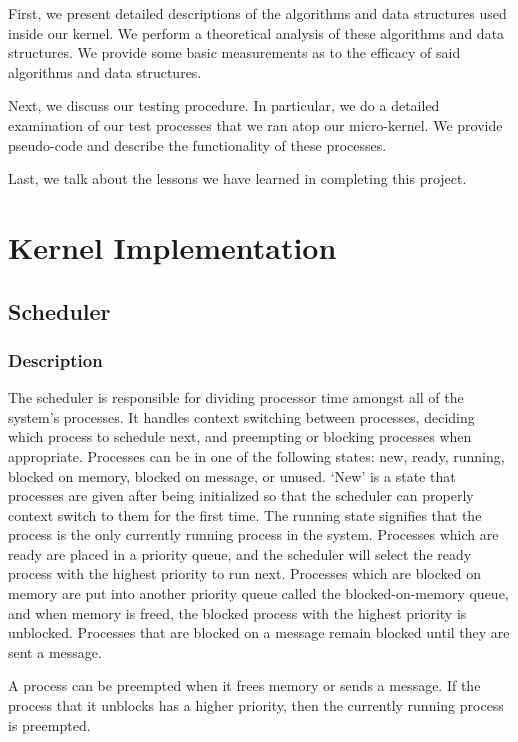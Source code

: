 \documentclass[12pt]{report}
\begin{document}
    First, we present detailed descriptions of the algorithms and data
    structures used inside our kernel. We perform a theoretical analysis of
    these algorithms and data structures. We provide some basic measurements as
    to the efficacy of said algorithms and data structures.

    Next, we discuss our testing procedure. In particular, we do a detailed
    examination of our test processes that we ran atop our micro-kernel. We
    provide pseudo-code and describe the functionality of these processes.

    Last, we talk about the lessons we have learned in completing this project.

\part{Kernel Implementation}

\chapter{Scheduler}

\section{Description}
    The scheduler is responsible for dividing processor time amongst all of the
    system's processes. It handles context switching between processes, deciding
    which process to schedule next, and preempting or blocking processes when
    appropriate. Processes can be in one of the following states: new, ready,
    running, blocked on memory, blocked on message, or unused. `New' is a state
    that processes are given after being initialized so that the scheduler can
    properly context switch to them for the first time. The running state
    signifies that the process is the only currently running process in the
    system. Processes which are ready are placed in a priority queue, and the
    scheduler will select the ready process with the highest priority to run
    next. Processes which are blocked on memory are put into another priority
    queue called the blocked-on-memory queue, and when memory is freed, the
    blocked process with the highest priority is unblocked. Processes that are
    blocked on a message remain blocked until they are sent a message.

    A process can be preempted when it frees memory or sends a message. If the
    process that it unblocks has a higher priority, then the currently running
    process is preempted.
\end{document}
